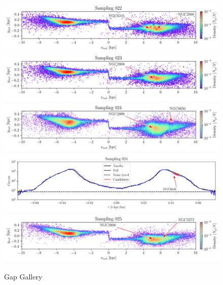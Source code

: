 \documentclass[draft]{aa}
\begin{document}
\begin{appendix}
    \begin{figure}
      \centering
      \includegraphics[width=\linewidth]{gallery_of_gaps_monte-carlo-022.png}
      \includegraphics[width=\linewidth]{gallery_of_gaps_monte-carlo-023.png}
      \includegraphics[width=\linewidth]{gallery_of_gaps_monte-carlo-024.png}   
      \includegraphics[width=\linewidth]{tau-profile-monte-carlo-024.png}
      \includegraphics[width=\linewidth]{gallery_of_gaps_monte-carlo-025.png}
      \caption{Gap Gallery}
      \label{fig:gallery5}
      \end{figure}        


\end{appendix}
\end{document}
